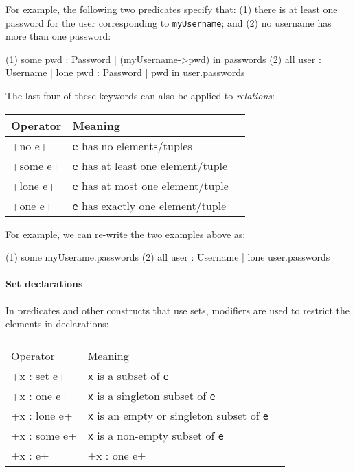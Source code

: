 For example, the following two predicates specify that: (1) there is at least one password for the user corresponding to \texttt{myUsername}; and (2) no username has more than one password:

\begin{alloy}
(1) some pwd : Password | (myUsername->pwd) in passwords
(2) all user : Username | lone pwd : Password | pwd in user.passwords
\end{alloy}

The last four of these keywords can also be applied to \emph{relations}:

\begin{center}
\begin{tabular}{lll}
\toprule
 Operator & Meaning\\
\midrule
 \A+no e+  & \texttt{e} has no elements/tuples\\
 \A+some e+  & \texttt{e} has at least one element/tuple\\
 \A+lone e+  & \texttt{e} has at most one element/tuple\\
 \A+one e+  & \texttt{e} has exactly one element/tuple\\
\bottomrule
\end{tabular}
\end{center}

For example, we can re-write the two examples above as:

\begin{alloy}
(1) some myUserame.passwords
(2) all user : Username | lone user.passwords
\end{alloy}

\paragraph{Set declarations}
In predicates and other constructs that use sets, modifiers are used to restrict the elements in declarations:

\begin{center}
\begin{tabular}{lll}
\toprule
          &         \\
 Operator & Meaning \\
\midrule
 \A+x : set e+ & \texttt{x} is a subset of \texttt{e}\\
 \A+x : one e+ & \texttt{x} is a singleton subset of \texttt{e}\\ 
 \A+x : lone e+ & \texttt{x} is an empty or singleton subset of \texttt{e}\\ 
 \A+x : some e+ & \texttt{x} is a non-empty subset of \texttt{e}\\ 
 \A+x : e+      & \A+x : one e+\\
\bottomrule
\end{tabular}
\end{center}

